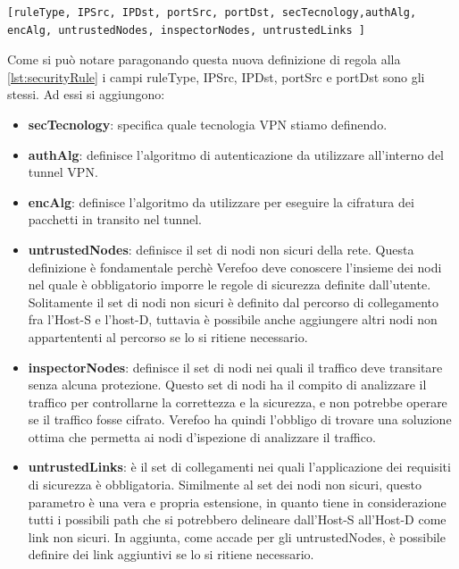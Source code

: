  \begin{lstlisting}[caption={Definizione di una proprietà di protezione},float={h}]
    [ruleType, IPSrc, IPDst, portSrc, portDst, secTecnology,authAlg, encAlg, untrustedNodes, inspectorNodes, untrustedLinks ]
\end{lstlisting}

Come si può notare paragonando questa nuova definizione di regola alla \ref{lst:securityRule} i campi ruleType, IPSrc, IPDst, portSrc e portDst sono gli stessi. Ad essi si aggiungono:

\begin{itemize}
    \item \textbf{secTecnology}: specifica quale tecnologia VPN stiamo definendo.
    \item \textbf{authAlg}: definisce l'algoritmo di autenticazione da utilizzare all'interno del tunnel VPN. 
    \item \textbf{encAlg}: definisce l'algoritmo da utilizzare per eseguire la cifratura dei pacchetti in transito nel tunnel.
    \item \textbf{untrustedNodes}: definisce il set di nodi non sicuri della rete. Questa definizione è fondamentale perchè Verefoo deve conoscere l'insieme dei nodi nel quale è obbligatorio imporre le regole di sicurezza definite dall'utente.
        Solitamente il set di nodi non sicuri è definito dal percorso di collegamento fra l'Host-S e l'host-D, tuttavia è possibile anche aggiungere altri nodi non appartententi al percorso se lo si ritiene necessario.
    \item \textbf{inspectorNodes}: definisce il set di nodi nei quali il traffico deve transitare senza alcuna protezione. Questo set di nodi ha il compito di analizzare il traffico per controllarne la correttezza e la sicurezza, e non potrebbe operare
        se il traffico fosse cifrato. Verefoo ha quindi l'obbligo di trovare una soluzione ottima che permetta ai nodi d'ispezione di analizzare il traffico. 
    \item \textbf{untrustedLinks}: è il set di collegamenti nei quali l'applicazione dei requisiti di sicurezza è obbligatoria.  Similmente al set dei nodi non sicuri, questo parametro è una vera e propria estensione, in quanto tiene in considerazione
        tutti i possibili path che si potrebbero delineare dall'Host-S all'Host-D come link non sicuri. In aggiunta, come accade per gli untrustedNodes, è possibile definire dei link aggiuntivi se lo si ritiene necessario.
\end{itemize}


